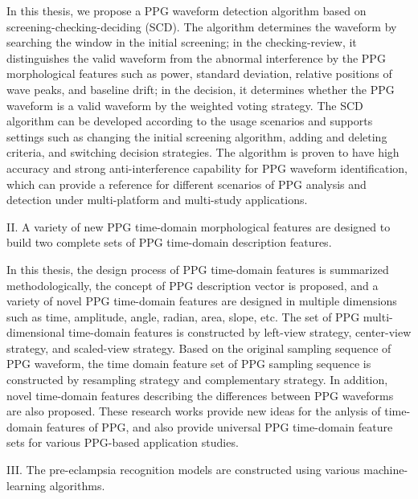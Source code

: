 In this thesis, we propose a PPG waveform detection algorithm based on screening-checking-deciding (SCD). The algorithm determines the waveform by searching the window 
in the initial screening; in the checking-review, it distinguishes the valid waveform from the abnormal interference by the PPG morphological features such as power, standard deviation, 
relative positions of wave peaks, and baseline drift; in the decision, it determines whether the PPG waveform is a valid waveform by the weighted voting strategy. 
The SCD algorithm can be developed according to the usage scenarios and supports settings such as changing the initial screening algorithm, adding and deleting criteria, 
and switching decision strategies. The algorithm is proven to have high accuracy and strong anti-interference capability for PPG waveform identification, 
which can provide a reference for different scenarios of PPG analysis and detection under multi-platform and multi-study applications.

II. A variety of new PPG time-domain morphological features are designed to build two complete sets of PPG time-domain description features.

In this thesis, the design process of PPG time-domain features is summarized methodologically, the concept of PPG description vector is proposed, 
and a variety of novel PPG time-domain features are designed in multiple dimensions such as time, amplitude, angle, radian, area, slope, etc. 
The set of PPG multi-dimensional time-domain features is constructed by left-view strategy, center-view strategy, and scaled-view strategy. 
Based on the original sampling sequence of PPG waveform, the time domain feature set of PPG sampling sequence is constructed by resampling strategy and 
complementary strategy. In addition, novel time-domain features describing the differences between PPG waveforms are also proposed. 
These research works provide new ideas for the anlysis of time-domain features of PPG, and also provide universal PPG time-domain feature sets for various PPG-based application studies.

III. The pre-eclampsia recognition models are constructed using various machine-learning algorithms.

